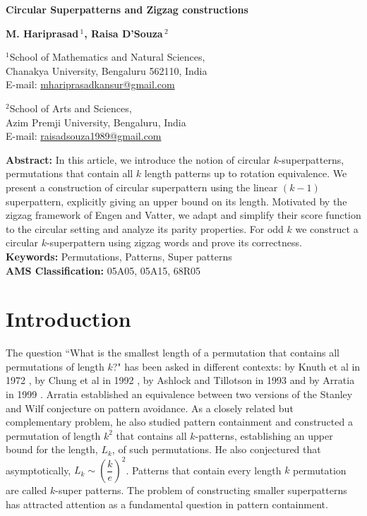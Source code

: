 \documentclass[a4paper,12pt]{article}
\theoremstyle{definition}
\numberwithin{equation}{section}
\begin{document}
\setcounter{page}{1} 



\begin{center}
{\LARGE \bf Circular Superpatterns and Zigzag constructions}
\vspace{8mm}

{\large\bf M. Hariprasad\,$^{1}$, Raisa D'Souza\,$^{2}$}

\vspace{3mm}

$^{1}$School of Mathematics and Natural Sciences,\\
Chanakya University, Bengaluru 562110, India\\
E-mail: \url{mhariprasadkansur@gmail.com}

\vspace{2mm}

$^{2}$School of Arts and Sciences,\\
Azim Premji University, Bengaluru, India \\
E-mail: \url{raisadsouza1989@gmail.com}

\usetikzlibrary{positioning}

\end{center}
\vspace{10mm}

\noindent
{\bf Abstract:} In this article, we introduce the notion of circular $k$-superpatterns, permutations that contain all $k$ length patterns up to rotation equivalence. We present a construction of circular superpattern using the linear $(k-1)$ superpattern, explicitly giving an upper bound on its length. Motivated by the zigzag framework of Engen and Vatter, we adapt and simplify their score function to the circular setting and analyze its parity properties. For odd $k$ we construct a circular $k$-superpattern using zigzag words and prove its correctness.\\
{\bf Keywords:} Permutations, Patterns, Super patterns\\
{\bf AMS Classification:} 05A05, 05A15, 68R05
\vspace{10mm}
\section{Introduction}

The question ``What is the smallest length of a permutation that contains all permutations of length $k$?" has been asked in different contexts: by Knuth et al in 1972 \cite{chvatal1972selected}, by Chung et al in 1992 \cite{chung1992universal}, by Ashlock and Tillotson in 1993 \cite{ashlock1993construction} and by Arratia in 1999 \cite{arratia1999stanley}. Arratia established an equivalence between two versions of the Stanley and Wilf conjecture on pattern avoidance. As a closely related but complementary problem, he also studied pattern containment and constructed a permutation of length $k^2$ that contains all $k$-patterns, establishing an upper bound for the length, $L_k$, of such permutations. He also conjectured that asymptotically, $L_k\sim \left(\dfrac{k}{e}\right)^2$. Patterns that contain every length $k$ permutation are called $k$-super patterns. The problem of constructing smaller superpatterns has attracted attention as a fundamental question in pattern containment.  
\end{document}
